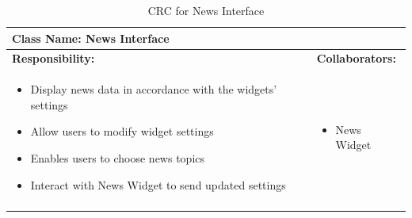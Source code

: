 \documentclass[]{article}
\begin{document}
\begin{longtable}{| p{} | p{} |}
	\hline
	\multicolumn{2}{|l|}{\textbf{Class Name: News Interface}} \\
	\hline
	\textbf{Responsibility:} & \textbf{Collaborators:} \\
	\hline
	\begin{itemize}
		\item Display news data in accordance with the widgets' settings
		\item Allow users to modify widget settings
		\item Enables users to choose news topics
		\item Interact with News Widget to send updated settings
    \end{itemize} & 
	\begin{itemize}
		\item News Widget
	\end{itemize} \\
	\hline
	\caption{CRC for News Interface}
\end{longtable}
\end{document}
